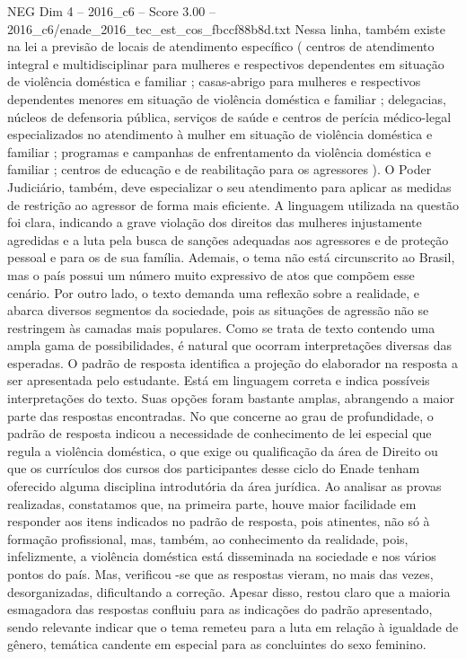 \begin{textsample}{NEG Dim 4 – 2016\_c6 – Score 3.00 – 2016\_c6/enade\_2016\_tec\_est\_cos\_fbccf88b8d.txt}
Nessa linha, também existe na lei a previsão de locais de atendimento específico ( centros de atendimento integral e multidisciplinar para mulheres e respectivos dependentes em situação de violência doméstica e familiar ; casas-abrigo para mulheres e respectivos dependentes menores em situação de violência doméstica e familiar ; delegacias, núcleos de defensoria pública, serviços de saúde e centros de perícia médico-legal especializados no atendimento à mulher em situação de violência doméstica e familiar ; programas e campanhas de enfrentamento da violência doméstica e familiar ; centros de educação e de reabilitação para os agressores ).
O Poder Judiciário, também, deve especializar o seu atendimento para aplicar as medidas de restrição ao agressor de forma mais eficiente.
A linguagem utilizada na questão foi clara, indicando a grave violação dos direitos das mulheres injustamente agredidas e a luta pela busca de sanções adequadas aos agressores e de proteção pessoal e para os de sua família.
Ademais, o tema não está circunscrito ao Brasil, mas o país possui um número muito expressivo de atos que compõem esse cenário.
Por outro lado, o texto demanda uma reflexão sobre a realidade, e abarca diversos segmentos da sociedade, pois as situações de agressão não se restringem às camadas mais populares.
Como se trata de texto contendo uma ampla gama de possibilidades, é natural que ocorram interpretações diversas das esperadas.
O padrão de resposta identifica a projeção do elaborador na resposta a ser apresentada pelo estudante.
Está em linguagem correta e indica possíveis interpretações do texto.
Suas opções foram bastante amplas, abrangendo a maior parte das respostas encontradas.
No que concerne ao grau de profundidade, o padrão de resposta indicou a necessidade de conhecimento de lei especial que regula a violência doméstica, o que exige ou qualificação da área de Direito ou que os currículos dos cursos dos participantes desse ciclo do Enade tenham oferecido alguma disciplina introdutória da área jurídica.
Ao analisar as provas realizadas, constatamos que, na primeira parte, houve maior facilidade em responder aos itens indicados no padrão de resposta, pois atinentes, não só à formação profissional, mas, também, ao conhecimento da realidade, pois, infelizmente, a violência doméstica está disseminada na sociedade e nos vários pontos do país.
Mas, verificou -se que as respostas vieram, no mais das vezes, desorganizadas, dificultando a correção.
Apesar disso, restou claro que a maioria esmagadora das respostas confluiu para as indicações do padrão apresentado, sendo relevante indicar que o tema remeteu para a luta em relação à igualdade de gênero, temática candente em especial para as concluintes do sexo feminino.

\end{textsample}
